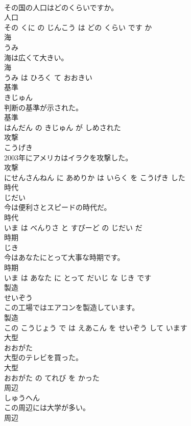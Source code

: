 \documentclass[8pt]{extreport}
\begin{document}
\begin{CJK}{UTF8}{min}
\\	その国の人口はどのくらいですか。	
\\	人口 
\\	その くに の じんこう は どの くらい です か			
\\	海	
\\	うみ			
\\	海は広くて大きい。	
\\	海 
\\	うみ は ひろく て おおきい			
\\	基準	
\\	きじゅん			
\\	判断の基準が示された。	
\\	基準 
\\	はんだん の きじゅん が しめされた			
\\	攻撃	
\\	こうげき			
\\	2003年にアメリカはイラクを攻撃した。	
\\	攻撃 
\\	にせんさんねん に あめりか は いらく を こうげき した			
\\	時代	
\\	じだい			
\\	今は便利さとスピードの時代だ。	
\\	時代 
\\	いま は べんりさ と すぴーど の じだい だ			
\\	時期	
\\	じき			
\\	今はあなたにとって大事な時期です。	
\\	時期 
\\	いま は あなた に とって だいじ な じき です			
\\	製造	
\\	せいぞう			
\\	この工場ではエアコンを製造しています。	
\\	製造 
\\	この こうじょう で は えあこん を せいぞう して います			
\\	大型	
\\	おおがた			
\\	大型のテレビを買った。	
\\	大型 
\\	おおがた の てれび を かった			
\\	周辺	
\\	しゅうへん			
\\	この周辺には大学が多い。	
\\	周辺 

\end{CJK}
\end{document}
